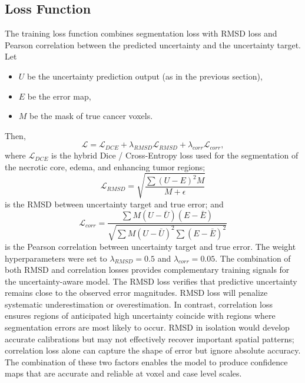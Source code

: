 \documentclass[11pt,letterpaper]{article}
\begin{document}
\subsection{Loss Function}
The training loss function combines segmentation loss with RMSD loss and Pearson correlation between the predicted uncertainty and the uncertainty target. Let
\begin{itemize}
    \item $U$ be the uncertainty prediction output (as in the previous section),
    \item $E$ be the error map,
    \item $M$ be the mask of true cancer voxels.
\end{itemize}
Then,
\begin{equation}
\mathcal{L} = \mathcal{L}_{DCE} + \lambda_{RMSD} \mathcal{L}_{RMSD}+ \lambda_{corr} \mathcal{L}_{corr},
\end{equation}
where $\mathcal{L}_{DCE}$ is the hybrid Dice / Cross-Entropy loss used for the segmentation of the necrotic core, edema, and enhancing tumor regions;
\begin{equation}
\mathcal{L}_{RMSD} = \sqrt{\frac{\sum (U-E)^2M}{M + \epsilon}}
\end{equation}
is the RMSD between uncertainty target and true error; and
\begin{equation}
\mathcal{L}_{corr} = \frac{\sum M (U - \bar{U})(E-\bar{E})}{\sqrt{\sum M(U - \bar{U})^2 \sum (E - \bar{E})^2}}
\end{equation}
is the Pearson correlation between uncertainty target and true error. The weight hyperparameters were set to $\lambda_{RMSD} = 0.5$ and $\lambda_{corr} = 0.05$.
The combination of both RMSD and correlation losses provides complementary training signals for the uncertainty-aware model. The RMSD loss verifies that predictive uncertainty remains close to the observed error magnitudes. RMSD loss will penalize systematic underestimation or overestimation. In contrast, correlation loss ensures regions of anticipated high uncertainty coincide with regions where segmentation errors are most likely to occur. RMSD in isolation would develop accurate calibrations but may not effectively recover important spatial patterns; correlation loss alone can capture the shape of error but ignore absolute accuracy. The combination of these two factors enables the model to produce confidence maps that are accurate and reliable at voxel and case level scales.
\end{document}
